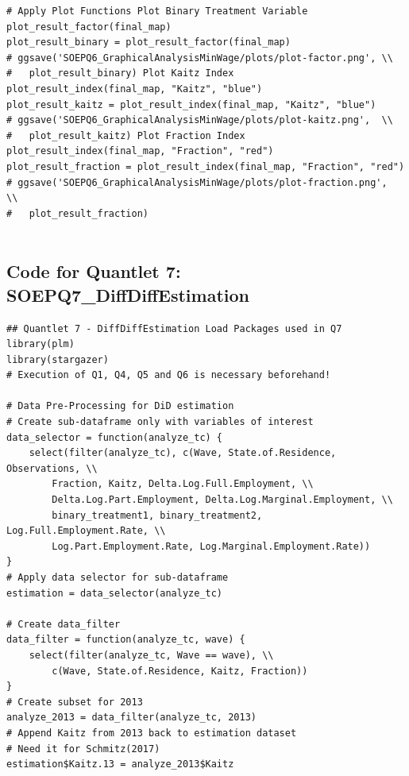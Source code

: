 \documentclass[a4paper]{article}
\begin{document}
{\begin{lstlisting}
# Apply Plot Functions Plot Binary Treatment Variable
plot_result_factor(final_map)
plot_result_binary = plot_result_factor(final_map)
# ggsave('SOEPQ6_GraphicalAnalysisMinWage/plots/plot-factor.png', \\ 
#	plot_result_binary) Plot Kaitz Index
plot_result_index(final_map, "Kaitz", "blue")
plot_result_kaitz = plot_result_index(final_map, "Kaitz", "blue")
# ggsave('SOEPQ6_GraphicalAnalysisMinWage/plots/plot-kaitz.png',  \\ 
#	plot_result_kaitz) Plot Fraction Index
plot_result_index(final_map, "Fraction", "red")
plot_result_fraction = plot_result_index(final_map, "Fraction", "red")
# ggsave('SOEPQ6_GraphicalAnalysisMinWage/plots/plot-fraction.png',  \\ 
#	plot_result_fraction)


\end{lstlisting}

\subsection{Code for Quantlet 7: SOEPQ7\_DiffDiffEstimation}
\begin{lstlisting}
## Quantlet 7 - DiffDiffEstimation Load Packages used in Q7
library(plm)
library(stargazer)
# Execution of Q1, Q4, Q5 and Q6 is necessary beforehand!

# Data Pre-Processing for DiD estimation 
# Create sub-dataframe only with variables of interest
data_selector = function(analyze_tc) {
    select(filter(analyze_tc), c(Wave, State.of.Residence, Observations, \\ 
    	Fraction, Kaitz, Delta.Log.Full.Employment, \\ 
    	Delta.Log.Part.Employment, Delta.Log.Marginal.Employment, \\
        binary_treatment1, binary_treatment2, Log.Full.Employment.Rate, \\
        Log.Part.Employment.Rate, Log.Marginal.Employment.Rate))
}
# Apply data selector for sub-dataframe
estimation = data_selector(analyze_tc)

# Create data_filter
data_filter = function(analyze_tc, wave) {
    select(filter(analyze_tc, Wave == wave), \\
    	c(Wave, State.of.Residence, Kaitz, Fraction))
}
# Create subset for 2013
analyze_2013 = data_filter(analyze_tc, 2013)
# Append Kaitz from 2013 back to estimation dataset 
# Need it for Schmitz(2017)
estimation$Kaitz.13 = analyze_2013$Kaitz


\end{lstlisting}}
\end{document}
